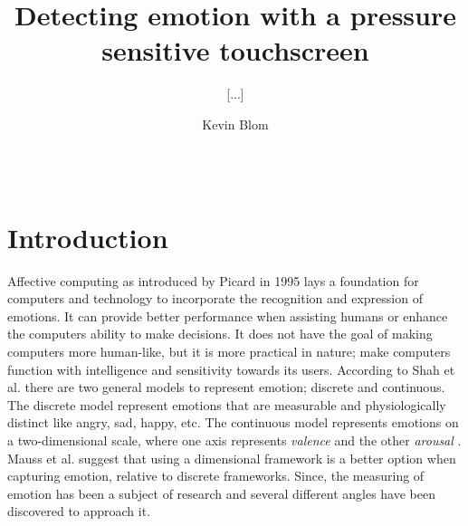 \documentclass{sig-alternate}
\begin{document}
\title{Detecting emotion with a pressure sensitive touchscreen}
\subtitle{[...]}


%
\author{
%
\alignauthor Kevin Blom\\
       \\
       \\
}

\maketitle

\begin{abstract}
	
\end{abstract}

\section{Introduction} %
\label{sec:introduction}
Affective computing as introduced by Picard\cite{Picard1995} in 1995 lays a foundation for computers and technology to incorporate the recognition and expression of emotions. It can provide better performance when assisting humans or enhance the computers ability to make decisions. It does not have the goal of making computers more human-like, but it is more practical in nature; make computers function with intelligence and sensitivity towards its users\cite{Picard1997}.  According to Shah et al.\cite{Shah2015} there are two general models to represent emotion; discrete and continuous. The discrete model represent emotions that are measurable and physiologically distinct like angry, sad, happy, etc. \cite{Ekman1992} The continuous model represents emotions on a two-dimensional scale, where one axis represents \textit{valence} and the other \textit{arousal} \cite{Posner2005}. Mauss et al. \cite{Mauss2009} suggest that using a dimensional framework is a better option when capturing emotion, relative to discrete frameworks. Since, the measuring of emotion has been a subject of research and several different angles have been discovered to approach it.
\end{document}
